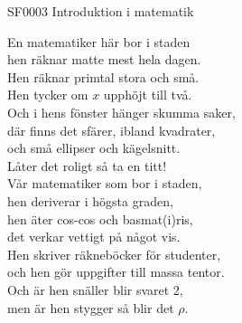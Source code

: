 \documentclass[a6paper, 10pt, twoside]{article}
\begin{document}
\noindent
\begin{center}
\footnotesize SF0003 Introduktion i matematik\\
\end{center}
\begin{lyrics}
En matematiker här bor i staden \\
hen räknar matte mest hela dagen. \\
Hen räknar primtal stora och små. \\
Hen tycker om $x$ upphöjt till två. \\
Och i hens fönster hänger skumma saker, \\
där finns det sfärer, ibland kvadrater, \\
och små ellipser och kägelsnitt. \\
Låter det roligt så ta en titt! 
\vspace{5pt} \\
Vår matematiker som bor i staden, \\
hen deriverar i högsta graden, \\
hen äter cos-cos och basmat(i)ris, \\
det verkar vettigt på något vis. \\
Hen skriver räkneböcker för studenter, \\
och hen gör uppgifter till massa tentor. \\
Och är hen snäller blir svaret 2, \\
men är hen stygger så blir det $\rho$. 
\end{lyrics}
\end{document}
